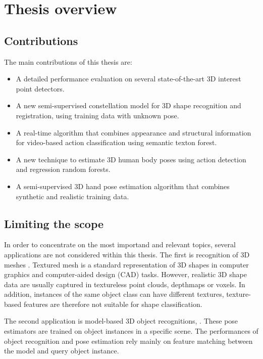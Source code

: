 \section{Thesis overview}

\subsection{Contributions}

The main contributions of this thesis are:
\begin{itemize}
	\item A detailed performance evaluation on several state-of-the-art 3D interest point detectors.
	\item A new semi-supervised constellation model for 3D shape recognition and registration, using training data with unknown pose. 
	\item A real-time algorithm that combines appearance and structural information for video-based action classification using semantic texton forest. 
	\item A new technique to estimate 3D human body poses using action detection and regression random forests. 
	\item A semi-supervised 3D hand pose estimation algorithm that combines synthetic and realistic training data. 
\end{itemize}

\subsection{Limiting the scope}

In order to concentrate on the most importand and relevant topics, 
several applications are not considered within this thesis. 
The first is recognition of 3D meshes \cite{Zaharescu2009, Bronstein2011, Kokkinos2012}. Textured mesh is a standard representation of 3D shapes in computer graphics and computer-aided design (CAD) tasks. However, realistic 3D shape data are usually captured in textureless point clouds, depthmaps or voxels. In addition, instances of the same object class can have different textures, texture-based features are therefore not suitable for shape classification.      

The second application is model-based 3D object recognitions, \eg \cite{Mian2006, Rothganger2006, Shang2010}. These pose estimators are trained on object instances in a specific scene. The performances of object recognition and pose estimation rely mainly on feature matching between the model and query object instance. 


